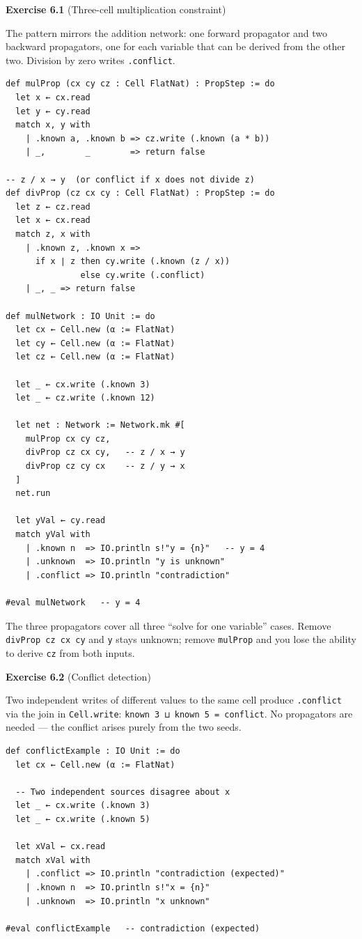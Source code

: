 \documentclass[12pt, a4paper, openright]{book}
\theoremstyle{thmstyle}
\theoremstyle{defstyle}
\newcommand{\lc}[1]{\texttt{#1}}
\begin{document}
\textbf{Exercise 6.1} (Three-cell multiplication constraint)

The pattern mirrors the addition network: one forward propagator and two
backward propagators, one for each variable that can be derived from the
other two. Division by zero writes \lc{.conflict}.

\begin{verbatim}
def mulProp (cx cy cz : Cell FlatNat) : PropStep := do
  let x ← cx.read
  let y ← cy.read
  match x, y with
    | .known a, .known b => cz.write (.known (a * b))
    | _,        _        => return false

-- z / x → y  (or conflict if x does not divide z)
def divProp (cz cx cy : Cell FlatNat) : PropStep := do
  let z ← cz.read
  let x ← cx.read
  match z, x with
    | .known z, .known x =>
      if x ∣ z then cy.write (.known (z / x))
               else cy.write (.conflict)
    | _, _ => return false

def mulNetwork : IO Unit := do
  let cx ← Cell.new (α := FlatNat)
  let cy ← Cell.new (α := FlatNat)
  let cz ← Cell.new (α := FlatNat)

  let _ ← cx.write (.known 3)
  let _ ← cz.write (.known 12)

  let net : Network := Network.mk #[
    mulProp cx cy cz,
    divProp cz cx cy,   -- z / x → y
    divProp cz cy cx    -- z / y → x
  ]
  net.run

  let yVal ← cy.read
  match yVal with
    | .known n  => IO.println s!"y = {n}"   -- y = 4
    | .unknown  => IO.println "y is unknown"
    | .conflict => IO.println "contradiction"

#eval mulNetwork   -- y = 4
\end{verbatim}

The three propagators cover all three ``solve for one variable'' cases.
Remove \lc{divProp cz cx cy} and \lc{y} stays unknown; remove
\lc{mulProp} and you lose the ability to derive \lc{cz} from both inputs.

\textbf{Exercise 6.2} (Conflict detection)

Two independent writes of different values to the same cell produce
\lc{.conflict} via the join in \lc{Cell.write}: \lc{known 3 ⊔ known 5 = conflict}.
No propagators are needed --- the conflict arises purely from the two seeds.

\begin{verbatim}
def conflictExample : IO Unit := do
  let cx ← Cell.new (α := FlatNat)

  -- Two independent sources disagree about x
  let _ ← cx.write (.known 3)
  let _ ← cx.write (.known 5)

  let xVal ← cx.read
  match xVal with
    | .conflict => IO.println "contradiction (expected)"
    | .known n  => IO.println s!"x = {n}"
    | .unknown  => IO.println "x unknown"

#eval conflictExample   -- contradiction (expected)
\end{verbatim}
\end{document}

